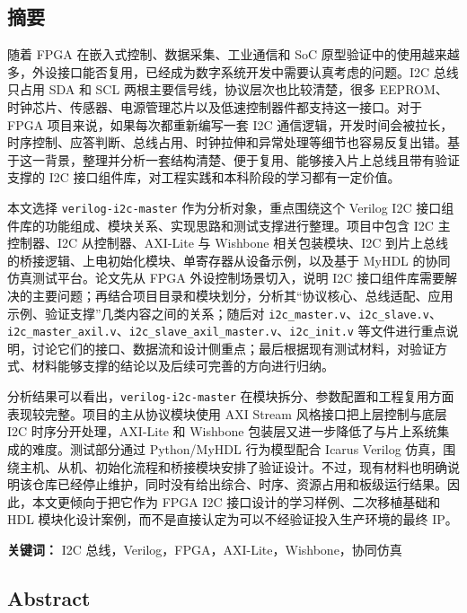 \subsection{摘要}\label{ux6458ux8981}

随着 FPGA 在嵌入式控制、数据采集、工业通信和 SoC 原型验证中的使用越来越多，外设接口能否复用，已经成为数字系统开发中需要认真考虑的问题。I2C 总线只占用 SDA 和 SCL 两根主要信号线，协议层次也比较清楚，很多 EEPROM、时钟芯片、传感器、电源管理芯片以及低速控制器件都支持这一接口。对于 FPGA 项目来说，如果每次都重新编写一套 I2C 通信逻辑，开发时间会被拉长，时序控制、应答判断、总线占用、时钟拉伸和异常处理等细节也容易反复出错。基于这一背景，整理并分析一套结构清楚、便于复用、能够接入片上总线且带有验证支撑的 I2C 接口组件库，对工程实践和本科阶段的学习都有一定价值。

本文选择 \texttt{verilog-i2c-master} 作为分析对象，重点围绕这个 Verilog I2C 接口组件库的功能组成、模块关系、实现思路和测试支撑进行整理。项目中包含 I2C 主控制器、I2C 从控制器、AXI-Lite 与 Wishbone 相关包装模块、I2C 到片上总线的桥接逻辑、上电初始化模块、单寄存器从设备示例，以及基于 MyHDL 的协同仿真测试平台。论文先从 FPGA 外设控制场景切入，说明 I2C 接口组件库需要解决的主要问题；再结合项目目录和模块划分，分析其``协议核心、总线适配、应用示例、验证支撑''几类内容之间的关系；随后对 \texttt{i2c\_master.v}、\texttt{i2c\_slave.v}、\texttt{i2c\_master\_axil.v}、\texttt{i2c\_slave\_axil\_master.v}、\texttt{i2c\_init.v} 等文件进行重点说明，讨论它们的接口、数据流和设计侧重点；最后根据现有测试材料，对验证方式、材料能够支撑的结论以及后续可完善的方向进行归纳。

分析结果可以看出，\texttt{verilog-i2c-master} 在模块拆分、参数配置和工程复用方面表现较完整。项目的主从协议模块使用 AXI Stream 风格接口把上层控制与底层 I2C 时序分开处理，AXI-Lite 和 Wishbone 包装层又进一步降低了与片上系统集成的难度。测试部分通过 Python/MyHDL 行为模型配合 Icarus Verilog 仿真，围绕主机、从机、初始化流程和桥接模块安排了验证设计。不过，现有材料也明确说明该仓库已经停止维护，同时没有给出综合、时序、资源占用和板级运行结果。因此，本文更倾向于把它作为 FPGA I2C 接口设计的学习样例、二次移植基础和 HDL 模块化设计案例，而不是直接认定为可以不经验证投入生产环境的最终 IP。

\textbf{关键词：} I2C 总线，Verilog，FPGA，AXI-Lite，Wishbone，协同仿真

\subsection{Abstract}\label{abstract}

